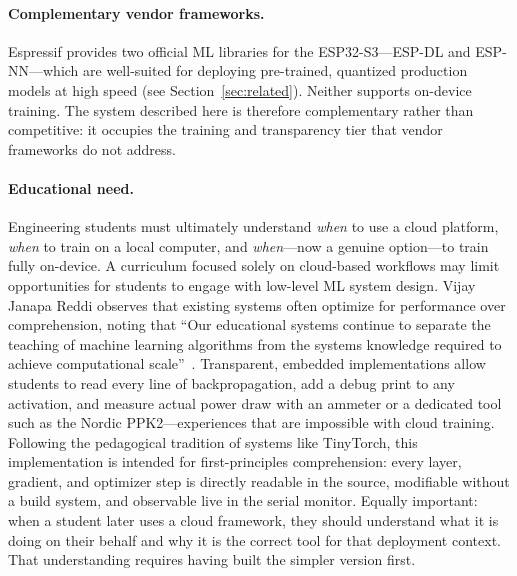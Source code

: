 \documentclass[12pt]{article}
\begin{document}
\paragraph{Complementary vendor frameworks.}
Espressif provides two official ML libraries for the ESP32-S3---ESP-DL and
ESP-NN---which are well-suited for deploying pre-trained, quantized production
models at high speed (see Section~\ref{sec:related}).
Neither supports on-device training.
The system described here is therefore complementary rather than competitive:
it occupies the training and transparency tier that vendor frameworks do not
address.

\paragraph{Educational need.}
Engineering students must ultimately understand \emph{when} to use a cloud
platform, \emph{when} to train on a local computer, and \emph{when}---now a
genuine option---to train fully on-device.
A curriculum focused solely on cloud-based workflows may limit opportunities for
students to engage with low-level ML system design.
Vijay Janapa Reddi observes that existing systems often optimize for performance over comprehension, noting that ``Our educational systems continue to separate the teaching of machine learning algorithms from the systems knowledge required to achieve computational scale''~\cite{reddi2024mlsysbook}.
Transparent, embedded implementations allow students to read every line of
backpropagation, add a debug print to any activation, and measure actual power
draw with an ammeter or a dedicated tool such as the Nordic PPK2---experiences
that are impossible with cloud training.
Following the pedagogical tradition of systems like TinyTorch, this implementation
is intended for first-principles comprehension: every layer, gradient, and
optimizer step is directly readable in the source, modifiable without a build
system, and observable live in the serial monitor.
Equally important: when a student later uses a cloud framework, they should
understand what it is doing on their behalf and why it is the correct tool for
that deployment context.
That understanding requires having built the simpler version first.
\end{document}
